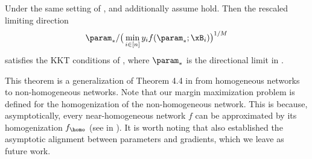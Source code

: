 \begin{theorem}
\label{thm: KKT convergence} 
Under the same setting of , and additionally assume  hold.
Then the rescaled limiting direction %
$$
\param_* / \big(\min_{i \in [n]} y_i f(\param_* ;\xB_i)\big)^{1/M}
$$ 
satisfies the KKT conditions of , where $\param_*$ is the directional limit in .
\end{theorem}

This theorem is a generalization of 
Theorem 4.4 in \citet{lyu2020gradient} from homogeneous networks to non-homogeneous networks. 
Note that our margin maximization problem  is defined for the homogenization of the non-homogeneous network. 
This is because, asymptotically, every near-homogeneous network $f$ can be approximated by its homogenization $f_{\homo}$ (see  in ). It is worth noting that \citet{ji2020directional} also established the asymptotic alignment between parameters and gradients, which we leave as future work.


